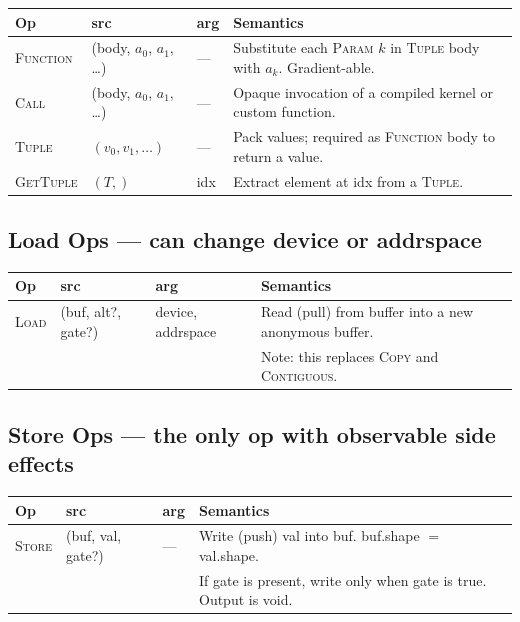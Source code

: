 \documentclass[10pt,letterpaper]{article}
\newcommand{\op}[1]{\textsc{#1}}
\begin{document}
\begin{tabular}{@{}l l l l@{}}
\toprule
\textbf{Op} & \textbf{src} & \textbf{arg} & \textbf{Semantics} \\
\midrule
\op{Function} & (body, $a_0$, $a_1$, \ldots) & --- & Substitute each \op{Param} $k$ in \op{Tuple} body with $a_k$. Gradient-able. \\
\op{Call} & (body, $a_0$, $a_1$, \ldots) & --- & Opaque invocation of a compiled kernel or custom function. \\
\op{Tuple} & $(v_0, v_1, \ldots)$ & --- & Pack values; required as \op{Function} body to return a value. \\
\op{GetTuple} & $(T,)$ & idx & Extract element at idx from a \op{Tuple}. \\
\bottomrule
\end{tabular}

\subsection*{{\color{loadred}Load Ops} \normalfont\small--- can change device or addrspace}

\begin{tabular}{@{}l l l l@{}}
\toprule
\textbf{Op} & \textbf{src} & \textbf{arg} & \textbf{Semantics} \\
\midrule
\op{Load} & (buf, alt?, gate?) & device, addrspace & Read (pull) from buffer into a new anonymous buffer. \\
  & & & Note: this replaces \op{Copy} and \op{Contiguous}. \\
\bottomrule
\end{tabular}

\subsection*{{\color{multipurple}Store Ops} \normalfont\small--- the only op with observable side effects}

\begin{tabular}{@{}l l l l@{}}
\toprule
\textbf{Op} & \textbf{src} & \textbf{arg} & \textbf{Semantics} \\
\midrule
\op{Store} & (buf, val, gate?) & --- & Write (push) val into buf. buf.shape $=$ val.shape. \\
  & & & If gate is present, write only when gate is true. Output is void. \\
\bottomrule
\end{tabular}
\end{document}
